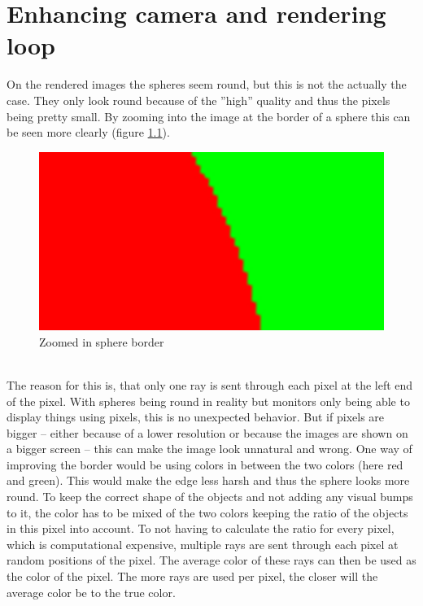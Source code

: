 \documentclass[12pt]{report}
\begin{document}
\chapter{Enhancing camera and rendering loop}
On the rendered images the spheres seem round, but this is not the actually the case. They only look round because of the ''high'' quality and thus the pixels being pretty small. By zooming into the image at the border of a sphere this can be seen more clearly (figure \ref{fig:aliasing}).
\begin{figure}[h!]
\includegraphics[width=\textwidth]{aliasing}
\centering
\caption{Zoomed in sphere border}
\label{fig:aliasing}
\end{figure} \\
The reason for this is, that only one ray is sent through each pixel at the left end of the pixel. With spheres being round in reality but monitors only being able to display things using pixels, this is no unexpected behavior. But if pixels are bigger -- either because of a lower resolution or because the images are shown on a bigger screen -- this can make the image look unnatural and wrong. One way of improving the border would be using colors in between the two colors (here red and green). This would make the edge less harsh and thus the sphere looks more round. To keep the correct shape of the objects and not adding any visual bumps to it, the color has to be mixed of the two colors keeping the ratio of the objects in this pixel into account. To not having to calculate the ratio for every pixel, which is computational expensive, multiple rays are sent through each pixel at random positions of the pixel. The average color of these rays can then be used as the color of the pixel. The more rays are used per pixel, the closer will the average color be to the true color.
\end{document}
